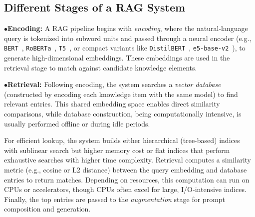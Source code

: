 

\subsection{Different Stages of a RAG System}
\label{sec:BG:RAGstage}
\noindent$\bullet$\textbf{Encoding:}
\label{sec:BG:Encoding}
A RAG pipeline begins with \emph{encoding}, where the natural-language query is tokenized into subword units and passed through a neural encoder (e.g., \texttt{BERT}~\cite{devlin2019bert}, \texttt{RoBERTa}~\cite{liu2019roberta}, \texttt{T5}~\cite{raffel2020exploring}, or compact variants like \texttt{DistilBERT}~\cite{sanh2019distilbert}, \texttt{e5-base-v2}~\cite{e5_base_v2}), to generate high-dimensional embeddings. 
These embeddings are used in the retrieval stage to match against candidate knowledge elements.

\noindent$\bullet$\textbf{Retrieval:}
\label{sec:BG:Retrieval}
Following encoding, the system searches a \emph{vector database} (constructed by encoding each knowledge item with the same model) to find relevant entries. This shared embedding space enables direct similarity comparisons, while database construction, being computationally intensive, is usually performed offline or during idle periods.

For efficient lookup, the system builds either hierarchical (tree-based) indices with sublinear search but higher memory cost or flat indices that perform exhaustive searches with higher time complexity. Retrieval computes a similarity metric (e.g., cosine or L2 distance) between the query embedding and database entries to return \topk{} matches. Depending on resources, this computation can run on CPUs or accelerators, though CPUs often excel for large, I/O-intensive indices. Finally, the top entries are passed to the \emph{augmentation} stage for prompt composition and generation.

